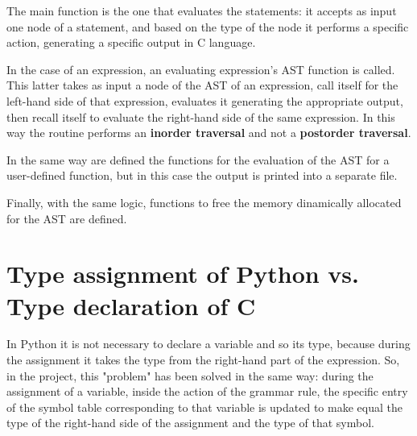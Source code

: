 \documentclass[a4paper,12pt,,titlepage,openright]{report}
\begin{document}
The main function is the one that evaluates the statements: it accepts as input one node of a statement, and based on the type of the node it performs a specific action, generating a specific output in C language. 

In the case of an expression, an evaluating expression's AST function is called. This latter takes as input a node of the AST of an expression, call itself for the left-hand side of that expression, evaluates it generating the appropriate output, then recall itself to evaluate the right-hand side of the same expression. In this way the routine performs an \textbf{inorder traversal} and not a \textbf{postorder traversal}.

In the same way are defined the functions for the evaluation of the AST for a user-defined function, but in this case the output is printed into a separate file.

Finally, with the same logic, functions to free the memory dinamically allocated for the AST are defined.

\section{Type assignment of Python vs. Type declaration of C}
In Python it is not necessary to declare a variable and so its type, because during the assignment  it takes the type from the right-hand part of the expression.
So, in the project, this "problem" has been solved in the same way: during the assignment of a variable, inside the action of the grammar rule, the specific entry of the symbol table corresponding to that variable is updated to make equal the type of the right-hand side of the assignment and the type of that symbol.
\end{document}
